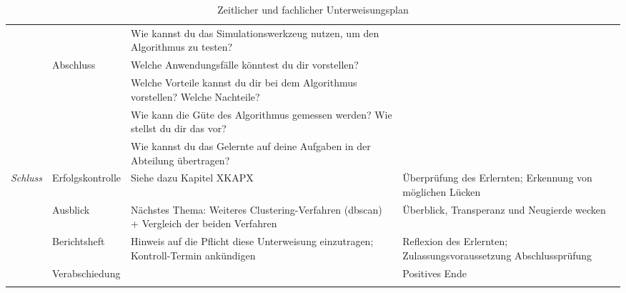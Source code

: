 \begin{longtable}[c]{@{}lp{3.5cm}p{4.5cm}p{4.0cm}@{}}
	\\* \cmidrule(lr){3-3}
	&
	&
	Wie kannst du das Simulationswerkzeug nutzen, um den Algorithmus zu testen? &
	\\* \cmidrule(lr){2-3}
	&
	\multirow{4}{*}{Abschluss} &
	Welche Anwendungsfälle könntest du dir vorstellen? &
	\\* \cmidrule(lr){3-3}
	&
	&
	Welche Vorteile kannst du dir bei dem Algorithmus vorstellen? Welche Nachteile? &
	\\* \cmidrule(lr){3-3}
	&
	&
	Wie kann die Güte des Algorithmus gemessen werden? Wie stellst du dir das vor? &
	\\* \cmidrule(lr){3-3}
	&
	&
	Wie kannst du das Gelernte auf deine Aufgaben in der Abteilung übertragen? &
	\\* \midrule
	\multirow{4}{*}{\textit{Schluss}} &
	Erfolgskontrolle &
	Siehe dazu Kapitel XKAPX &
	Überprüfung des Erlernten; Erkennung von möglichen Lücken \\* \cmidrule(l){2-4} 
	&
	Ausblick &
	Nächstes Thema: Weiteres Clustering-Verfahren (dbscan) + Vergleich der beiden Verfahren &
	Überblick, Transperanz und Neugierde wecken \\* \cmidrule(l){2-4} 
	&
	Berichtsheft &
	Hinweis auf die Pflicht diese Unterweisung einzutragen; Kontroll-Termin ankündigen &
	Reflexion des Erlernten; Zulassungsvoraussetzung Abschlussprüfung \\* \cmidrule(l){2-4} 
	&
	Verabschiedung &
	&
	Positives Ende \\* \bottomrule
	\caption{Zeitlicher und fachlicher Unterweisungsplan}
	\label{tab:Unterweisungsplan}\\
\end{longtable}